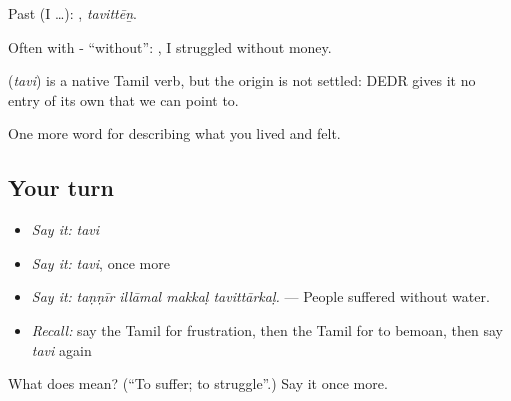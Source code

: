 Past (I …): , \emph{tavittēṉ}.

Often with - \textquotedblleft{}without\textquotedblright{}:   , I struggled without money.

\begin{cousinweb}
\textbf{} (\emph{tavi}) is a native Tamil verb, but the origin is not settled: DEDR gives it no entry of its own that we can point to.
\end{cousinweb}

\begin{grammarlens}[title={What you've built}]
One more word for describing what you lived and felt.
\end{grammarlens}

\subsection*{Your turn}
\begin{itemize}
\raggedright
  \item \emph{Say it:} \emph{tavi}
  \item \emph{Say it:} \emph{tavi}, once more
  \item \emph{Say it:} \emph{taṇṇīr illāmal makkaḷ tavittārkaḷ.} — People suffered without water.
  \item \emph{Recall:} say the Tamil for frustration, then the Tamil for to bemoan, then say \emph{tavi} again
\end{itemize}

\begin{tcolorbox}[breakable,colback=teal!4,colframe=teal!35!black,title={Before you move on}]
What does  mean? (\textquotedblleft{}To suffer; to struggle\textquotedblright{}.) Say it once more.
\end{tcolorbox}
